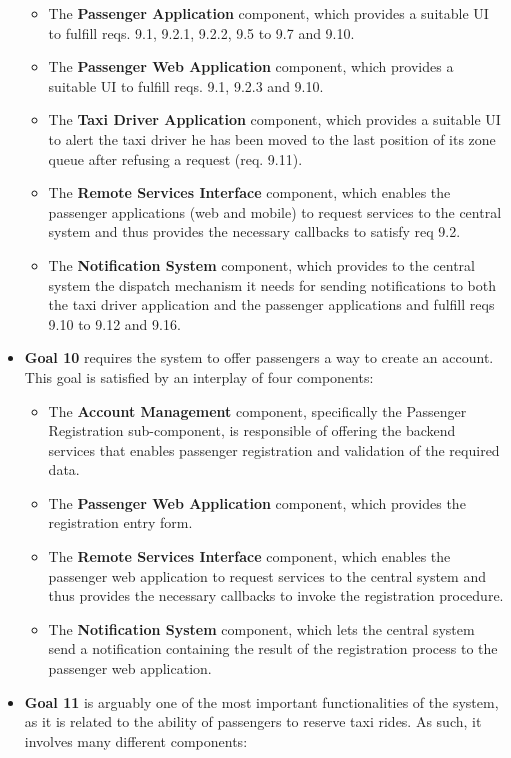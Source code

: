 \begin{itemize}
\begin{itemize}
		\item The \textbf{Passenger Application} component, which provides a suitable UI to fulfill reqs. 9.1, 9.2.1, 9.2.2, 9.5 to 9.7 and 9.10.
		\item The \textbf{Passenger Web Application} component, which provides a suitable UI to fulfill reqs. 9.1, 9.2.3 and 9.10.
		\item The \textbf{Taxi Driver Application} component, which provides a suitable UI to alert the taxi driver he has been moved to the last position of its zone queue after refusing a request (req. 9.11).
		\item The \textbf{Remote Services Interface} component, which enables the passenger applications (web and mobile) to request services to the central system and thus provides the necessary callbacks to satisfy req 9.2.
		\item The \textbf{Notification System} component, which provides to the central system the dispatch mechanism it needs for sending notifications to both the taxi driver application and the passenger applications and fulfill reqs 9.10 to 9.12 and 9.16.
	\end{itemize}
	\item \textbf{Goal 10} requires the system to offer passengers a way to create an account. This goal is satisfied by an interplay of four components:
	\begin{itemize}
		\item The \textbf{Account Management} component, specifically the Passenger Registration sub-component, is responsible of offering the backend services that enables passenger registration and validation of the required data. 
		\item The \textbf{Passenger Web Application} component, which provides the registration entry form.
		\item The \textbf{Remote Services Interface} component, which enables the passenger web application to request services to the central system and thus provides the necessary callbacks to invoke the registration procedure.
		\item The \textbf{Notification System} component, which lets the central system send a notification containing the result of the registration process to the passenger web application.
	\end{itemize}
	\item \textbf{Goal 11} is arguably one of the most important functionalities of the system, as it is related to the ability of passengers to reserve taxi rides. As such, it involves many different components:

\end{itemize}

